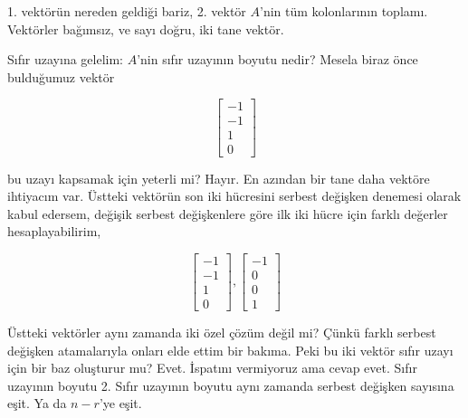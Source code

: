 \documentclass[12pt,fleqn]{article}\usepackage{../../common}
\begin{document}
1. vektörün nereden geldiği bariz, 2. vektör $A$'nin tüm kolonlarının
toplamı. Vektörler bağımsız, ve sayı doğru, iki tane vektör. 

Sıfır uzayına gelelim: $A$'nin sıfır uzayının boyutu nedir? Mesela biraz
önce bulduğumuz vektör

$$ 
\left[\begin{array}{r}
-1 \\ -1 \\ 1 \\ 0
\end{array}\right]
 $$

bu uzayı kapsamak için yeterli mi? Hayır. En azından bir tane daha vektöre
ihtiyacım var. Üstteki vektörün son iki hücresini serbest değişken denemesi
olarak kabul edersem, değişik serbest değişkenlere göre ilk iki hücre için
farklı değerler hesaplayabilirim,

$$ 
\left[\begin{array}{r}
-1 \\ -1 \\ 1 \\ 0
\end{array}\right],
\left[\begin{array}{r}
-1 \\ 0 \\ 0 \\ 1
\end{array}\right]
 $$

Üstteki vektörler aynı zamanda iki özel çözüm değil mi? Çünkü farklı
serbest değişken atamalarıyla onları elde ettim bir bakıma. Peki bu iki
vektör sıfır uzayı için bir baz oluşturur mu? Evet. İspatını vermiyoruz ama
cevap evet. Sıfır uzayının boyutu 2. Sıfır uzayının boyutu aynı zamanda
serbest değişken sayısına eşit. Ya da $n-r$'ye eşit. 
\end{document}
